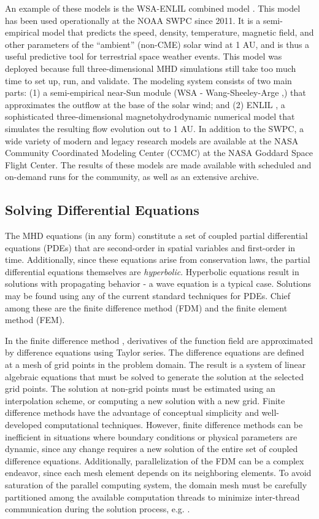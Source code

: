 \documentclass{article}
\begin{document}
An example of these models is the WSA-ENLIL combined model \cite{wsaenlil}. This model has been used operationally at the NOAA SWPC since 2011. It is a semi-empirical model that predicts the speed, density, temperature, magnetic field, and other parameters of the “ambient” (non-CME) solar wind at 1 AU, and is thus a useful predictive tool for terrestrial space weather events. This model was deployed because full three-dimensional MHD simulations still take too much time to set up, run, and validate. The modeling system consists of two main parts: (1)  a semi-empirical near-Sun module (WSA - Wang-Sheeley-Arge \cite{Arge2000},\cite{SheeleyJr2017}) that approximates the outflow at the base of the solar wind; and (2) ENLIL \cite{enlil}, a sophisticated three-dimensional magnetohydrodynamic numerical model that simulates the resulting flow  evolution out to 1 AU. In addition to the SWPC, a wide variety of modern and legacy research models are available at the NASA Community Coordinated Modeling Center (CCMC) \cite{ccmc} at the NASA Goddard Space Flight Center. The results of these models are made available with scheduled and on-demand runs for the community, as well as an extensive archive.

\subsection{Solving Differential Equations}

The MHD equations (in any form) constitute a set of coupled partial differential equations (PDEs) that are second-order in spatial variables and first-order in time. Additionally, since these equations arise from conservation laws, the partial differential equations themselves are \textit{hyperbolic}. Hyperbolic equations result in solutions with propagating behavior - a wave equation is a typical case. Solutions may be found using any of the current standard techniques for PDEs. Chief among these are the finite difference method (FDM) and the finite element method (FEM).

In the finite difference method \cite{Heath2002}, derivatives of the function field are approximated by difference equations using Taylor series. The difference equations are defined at a mesh of grid points in the problem domain. The result is a system of linear algebraic equations that must be solved to generate the solution at the selected grid points. The solution at non-grid points must be estimated using an interpolation scheme, or computing a new solution with a new grid. Finite difference methods have the advantage of conceptual simplicity and well-developed computational techniques. However, finite difference methods can be inefficient in situations where boundary conditions or physical parameters are dynamic, since any change requires a new solution of the entire set of coupled difference equations. Additionally, parallelization of the FDM can be a complex endeavor, since each mesh element depends on its neighboring elements. To avoid saturation of the parallel computing system, the domain mesh must be carefully partitioned among the available computation threads to minimize inter-thread communication during the solution process, e.g. \cite{Schreiber2017}.
\end{document}
